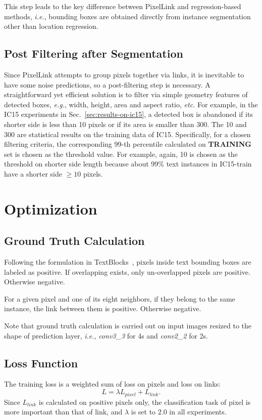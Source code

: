 \documentclass[letterpaper]{article} \usepackage{aaai18}  \usepackage{times}  \usepackage{helvet}  \usepackage{courier}  \usepackage{url}  \usepackage{graphicx}
\begin{document}
	This step leads to the key difference between PixelLink and regression-based methods, \emph{i.e.}, bounding boxes are obtained directly from instance segmentation other than location regression.
	
	\subsection{Post Filtering after Segmentation}
	Since PixelLink attempts to group pixels together via links, it is inevitable to have some noise predictions, so a post-filtering step is necessary. A straightforward yet efficient solution is to filter via simple geometry features of detected boxes, \emph{e.g.}, width, height, area and aspect ratio, \emph{etc.}  For example, in the IC15 experiments in Sec.~\ref{sec:results-on-ic15}, a detected box is abandoned if its shorter side is less than 10 pixels or if its area is smaller than 300. The 10 and 300 are statistical results on the training data of IC15. Specifically, for a chosen filtering criteria, the corresponding 99-th percentile calculated on \textbf{TRAINING} set is chosen as the threshold value. For example, again, 10 is chosen as the threshold on shorter side length because about 99\% text instances in IC15-train have a shorter side $\ge 10$ pixels.
	
	\section{Optimization}
	\subsection{Ground Truth Calculation}
	Following the formulation in TextBlocks~\cite{zhang2016TextBlock}, pixels inside text bounding boxes are labeled as positive. If overlapping exists, only un-overlapped pixels are positive. Otherwise negative.
	
	For a given pixel and one of its eight neighbors, if they belong to the same instance, the link between them is positive. Otherwise negative.
	
	Note that ground truth calculation is carried out on input images resized to the shape of prediction layer, \emph{i.e.}, \emph{conv3\_3} for 4s and \emph{conv2\_2} for 2s.
	
	\subsection{Loss Function}
	The training loss is a weighted sum of loss on pixels and loss on links:
	\begin{equation}
	L = \lambda L_{pixel} + L_{link}.
	\end{equation}
	Since $L_{link}$ is calculated on positive pixels only, the classification task of pixel is more important than that of link,  and $\lambda$ is set to 2.0 in all experiments.
\end{document}
